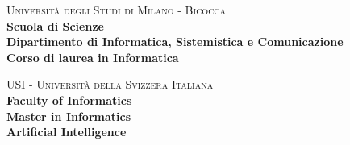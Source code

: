 \documentclass[a4paper,12pt]{report}
\begin{document}
    
    \begin{titlepage}
        
        \noindent
        \begin{minipage}[t]{0.19\textwidth}
        \end{minipage}
        \begin{minipage}[t]{0.81\textwidth}
        {
                {\textsc{Università degli Studi di Milano - Bicocca}} \\
                \textbf{Scuola di Scienze} \\
                \textbf{Dipartimento di Informatica, Sistemistica e Comunicazione} \\
                \textbf{Corso di laurea in Informatica} \\
                \par
        }
        \end{minipage}
        \noindent
        \begin{minipage}[t]{0.19\textwidth}
        \end{minipage}
        \begin{minipage}[t]{0.81\textwidth}
        {       
                \vspace{8.5mm}
                {\textsc{USI - Università della Svizzera Italiana}} \\
                \textbf{Faculty of Informatics} \\
                \textbf{Master in Informatics} \\
                \textbf{Artificial Intelligence}
                \par
        }
        \end{minipage}
        

\end{titlepage}
\end{document}
